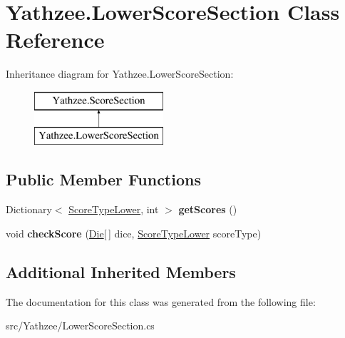 \hypertarget{class_yathzee_1_1_lower_score_section}{}\section{Yathzee.\+Lower\+Score\+Section Class Reference}
\label{class_yathzee_1_1_lower_score_section}
Inheritance diagram for Yathzee.\+Lower\+Score\+Section\+:\begin{figure}[H]
\begin{center}
\leavevmode
\includegraphics[height=2.000000cm]{class_yathzee_1_1_lower_score_section}
\end{center}
\end{figure}
\subsection*{Public Member Functions}
\begin{DoxyCompactItemize}
\item 
Dictionary$<$ \hyperlink{namespace_yathzee_ae036ce06cdf75e284ea1cd78a457ef70}{Score\+Type\+Lower}, int $>$ {\bfseries get\+Scores} ()\hypertarget{class_yathzee_1_1_lower_score_section_a427d65a33219f4e2d4965cc56f18e1a6}{}\label{class_yathzee_1_1_lower_score_section_a427d65a33219f4e2d4965cc56f18e1a6}

\item 
void {\bfseries check\+Score} (\hyperlink{class_yathzee_1_1_die}{Die}\mbox{[}$\,$\mbox{]} dice, \hyperlink{namespace_yathzee_ae036ce06cdf75e284ea1cd78a457ef70}{Score\+Type\+Lower} score\+Type)\hypertarget{class_yathzee_1_1_lower_score_section_acd14498c43eb2c788e450269095a9b61}{}\label{class_yathzee_1_1_lower_score_section_acd14498c43eb2c788e450269095a9b61}

\end{DoxyCompactItemize}
\subsection*{Additional Inherited Members}


The documentation for this class was generated from the following file\+:\begin{DoxyCompactItemize}
\item 
src/\+Yathzee/Lower\+Score\+Section.\+cs\end{DoxyCompactItemize}
